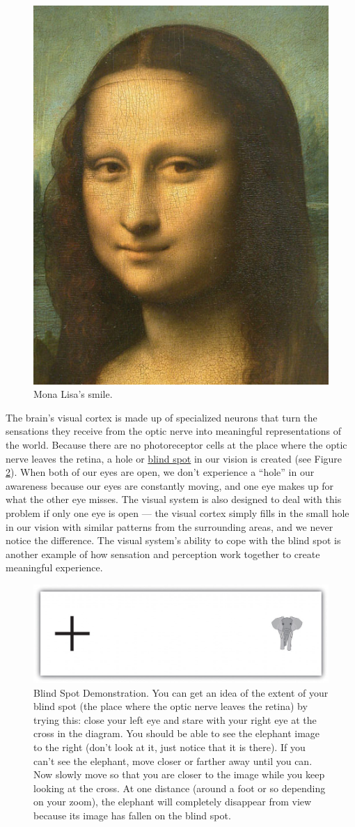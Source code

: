 \documentclass[
]{krantz}
\begin{document}
\begin{figure}

{\centering \includegraphics[width=0.3\linewidth]{images/ch2/fig2} 

}

\caption{Mona Lisa's smile.}\label{fig:monalisa}
\end{figure}

The brain's visual cortex is made up of specialized neurons that turn the sensations they receive from the optic nerve into meaningful representations of the world. Because there are no photoreceptor cells at the place where the optic nerve leaves the retina, a hole or \hyperref[blind-spot]{blind spot} in our vision is created (see Figure \ref{fig:blindspot}). When both of our eyes are open, we don't experience a ``hole'' in our awareness because our eyes are constantly moving, and one eye makes up for what the other eye misses. The visual system is also designed to deal with this problem if only one eye is open --- the visual cortex simply fills in the small hole in our vision with similar patterns from the surrounding areas, and we never notice the difference. The visual system's ability to cope with the blind spot is another example of how sensation and perception work together to create meaningful experience.

\begin{figure}

{\centering \includegraphics[width=0.6\linewidth]{images/ch2/fig3} 

}

\caption{Blind Spot Demonstration. You can get an idea of the extent of your blind spot (the place where the optic nerve leaves the retina) by trying this: close your left eye and stare with your right eye at the cross in the diagram. You should be able to see the elephant image to the right (don’t look at it, just notice that it is there). If you can’t see the elephant, move closer or farther away until you can. Now slowly move so that you are closer to the image while you keep looking at the cross. At one distance (around a foot or so depending on your zoom), the elephant will completely disappear from view because its image has fallen on the blind spot.}\label{fig:blindspot}
\end{figure}
\end{document}
